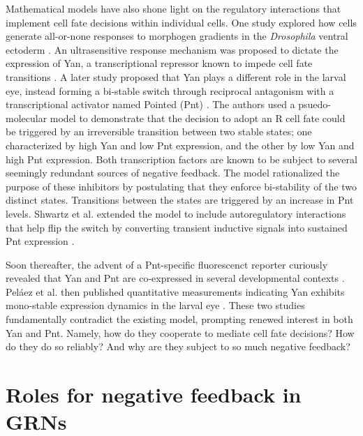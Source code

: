 Mathematical models have also shone light on the regulatory interactions that implement cell fate decisions within individual cells. One study explored how cells generate all-or-none responses to morphogen gradients in the \emph{Drosophila} ventral ectoderm \cite{Melen2005}. An ultrasensitive response mechanism was proposed to dictate the expression of Yan, a transcriptional repressor known to impede cell fate transitions \cite{Lai1992a,Rogge1995,Rebay1995}. A later study proposed that Yan plays a different role in the larval eye, instead forming a bi-stable switch through reciprocal antagonism with a transcriptional activator named Pointed (Pnt) \cite{Graham2010}. The authors used a psuedo-molecular model to demonstrate that the decision to adopt an R cell fate could be triggered by an irreversible transition between two stable states; one characterized by high Yan and low Pnt expression, and the other by low Yan and high Pnt expression. Both transcription factors are known to be subject to several seemingly redundant sources of negative feedback. The model rationalized the purpose of these inhibitors by postulating that they enforce bi-stability of the two distinct states. Transitions between the states are triggered by an increase in Pnt levels. Shwartz et al. extended the model to include autoregulatory interactions that help flip the switch by converting transient inductive signals into sustained Pnt expression \cite{Shwartz2013}.

Soon thereafter, the advent of a Pnt-specific fluorescenct reporter curiously revealed that Yan and Pnt are co-expressed in several developmental contexts \cite{BoisclairLachance2014}. Pel\'{a}ez et al. then published quantitative measurements indicating Yan exhibits  mono-stable expression dynamics in the larval eye \cite{Pelaez2015a}. These two studies fundamentally contradict the existing model, prompting renewed interest in both Yan and Pnt. Namely, how do they cooperate to mediate cell fate decisions? How do they do so reliably? And why are they subject to so much negative feedback?

\section{Roles for negative feedback in GRNs}
 
